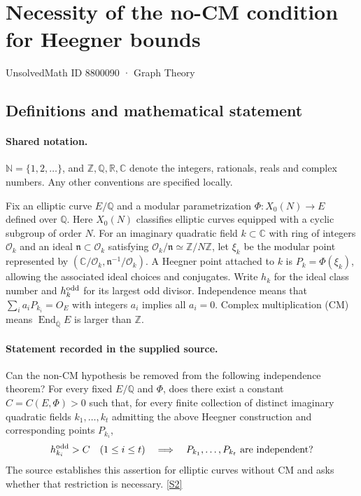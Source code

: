 \documentclass[11pt]{article}
\newcommand{\sref}[2]{\hyperlink{source:#1:#2}{[S#2]}}
\begin{document}
\setcounter{section}{8800089}
\section{Necessity of the no-CM condition for Heegner bounds}\label{8800090}
{\small\sffamily UnsolvedMath ID 8800090 · Graph Theory}
\subsection{Definitions and mathematical statement}

\paragraph{Shared notation.}$\mathbb N=\{1,2,\ldots\}$, and $\mathbb Z,\mathbb Q,\mathbb R,\mathbb C$ denote the integers, rationals, reals and complex numbers. Any other conventions are specified locally.


Fix an elliptic curve $E/\mathbb Q$ and a modular parametrization $\Phi:X_0(N)\to E$ defined over $\mathbb Q$. Here $X_0(N)$ classifies elliptic curves equipped with a cyclic subgroup of order $N$. For an imaginary quadratic field $k\subset\mathbb C$ with ring of integers $\mathcal O_k$ and an ideal $\mathfrak n\subset\mathcal O_k$ satisfying $\mathcal O_k/\mathfrak n\simeq\mathbb Z/N\mathbb Z$, let $\xi_k$ be the modular point represented by $(\mathbb C/\mathcal O_k,\mathfrak n^{-1}/\mathcal O_k)$. A Heegner point attached to $k$ is $P_k=\Phi(\xi_k)$, allowing the associated ideal choices and conjugates. Write $h_k$ for the ideal class number and $h_k^{\rm odd}$ for its largest odd divisor. Independence means that $\sum_i a_iP_{k_i}=O_E$ with integers $a_i$ implies all $a_i=0$. Complex multiplication (CM) means $\operatorname{End}_{\overline{\mathbb Q}}E$ is larger than $\mathbb Z$.
\paragraph{Statement recorded in the supplied source.}
Can the non-CM hypothesis be removed from the following independence theorem? For every fixed $E/\mathbb Q$ and $\Phi$, does there exist a constant $C=C(E,\Phi)>0$ such that, for every finite collection of distinct imaginary quadratic fields $k_1,\ldots,k_t$ admitting the above Heegner construction and corresponding points $P_{k_i}$,
\[
 h_{k_i}^{\rm odd}>C\quad(1\le i\le t)
 \quad\Longrightarrow\quad P_{k_1},\ldots,P_{k_t}\text{ are independent}?
\]
The source establishes this assertion for elliptic curves without CM and asks whether that restriction is necessary. \sref{8800090}{2}
\end{document}

